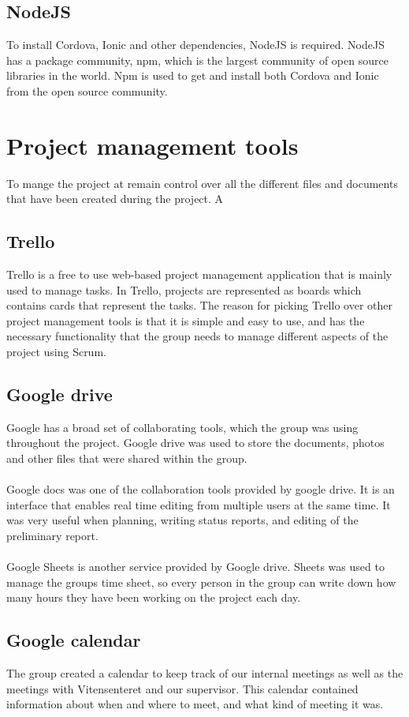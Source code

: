 {\subsection{NodeJS} To install Cordova, Ionic and other dependencies, NodeJS is required. NodeJS has a package community, npm, which is the largest community of open source libraries in the world. Npm is used to get and install both Cordova and Ionic from the open source community.\cite{nodejs}

\section{Project management tools}
To mange the project at remain control over all the different files and documents that have been created during the project. A 

\subsection{Trello}
Trello is a free to use web-based project management application that is mainly used to manage tasks. In Trello, projects are represented as boards which contains cards that represent the tasks. The reason for picking Trello over other project management tools is that it is simple and easy to use, and has the necessary functionality that the group needs to manage different aspects of the project using Scrum.

\subsection{Google drive}
Google has a broad set of collaborating tools, which the group was using throughout the project. Google drive was used to store the documents, photos and other files that were shared within the group.\\
\\
Google docs was one of the collaboration tools provided by google drive. It is an interface that enables real time editing from multiple users at the same time. It was very useful when planning, writing status reports, and editing of the preliminary report.\\
\\
Google Sheets is another service provided by Google drive. Sheets was used to manage the groups time sheet, so every person in the group can write down how many hours they have been working on the project each day. 

\subsection{Google calendar}
The group created a calendar to keep track of our internal meetings as well as the meetings with Vitensenteret and our supervisor. This calendar contained information about when and where to meet, and what kind of meeting it was.

}
